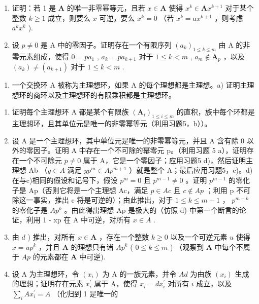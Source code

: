 \begin{enumerate}
\def\labelenumi{\alph{enumi})}
\setcounter{enumi}{2}
\item
  证明：若 1 是 \(\mathbf{A}\) 的唯一非零幂等元，且若 \(x \in \mathbf{A}\) 使得 \(x^k \in \mathbf{A}x^{k+1}\) 对于某个整数 \(k \geqslant 1\) 成立，则要么 \(x\) 可逆，要么 \(x^k = 0\) （若 \(x^k = ax^{k+1}\) ，则考虑 \(a^k x^k\) ).
\item
  设 \(p \neq 0\) 是 A 中的零因子。证明存在一个有限序列 \((a_k)_{1 \leqslant k \leqslant m}\) 由 A 的非零元素组成，使得 \(0 = pa_1\) , \(a_k = pa_{k+1}\) 对于 \(1 \leqslant k < m\) , \(a_m \notin \mathbf{A}_p\) ，以及 \((a_k) \neq (a_{k+1})\) 对于 \(1 \leqslant k < m\) .
\end{enumerate}

\begin{enumerate}
\def\labelenumi{\arabic{enumi})}
\setcounter{enumi}{5}
\tightlist
\item
  一个交换环 A 被称为主理想环，如果 A 的每个理想都是主理想。a) 证明主理想环的商环以及主理想环的有限乘积都是主理想环。
\end{enumerate}

\begin{enumerate}
\def\labelenumi{\alph{enumi})}
\setcounter{enumi}{1}
\item
  证明每个主理想环 A 都是某个有限族 \((\mathbf{A}_{i})_{1\leq i\leq m}\) 的直积，族中每个环都是主理想环，且其单位元是唯一的非零幂等元（利用习题5，b））。
\item
  设 A 是一个主理想环，其中单位元是唯一的非零幂等元，并且 A 含有除 0 以外的零因子。证明 A 中存在一个不可除的幂零元 p。（利用习题 5 a），证明存在一个不可除元 \(p \neq 0\) 属于 A，它是一个零因子；应用习题5 d)，然后证明主理想 Ab （\(y \in A\) 满足 \(yp^{m} \in Ap^{m+1}\) ）就是整个 A；最后应用习题5，c)。d) 在与c)相同的假设和记号下，假设 \(p^{m} = 0\) 且 \(p^{m-1} \neq 0\) 。证明 \(p^{m-1}\) 的零化子是 Ap（否则它将是一个主理想 Ac，满足 \(p \in Ac\) 且 \(c \notin Ap\) ；利用 p 不可除这一事实，推出 c 将是可逆的）；由此推出，对于 \(1 \leq k \leq m-1\) ， \(p^{m-k}\) 的零化子是 \(Ap^{k}\) 。由此得出理想 Ap 是极大的（仿照 d) 中第一个断言的论证，利用 1 - xp 在 A 中可逆，对所有 \(x \in A\) .
\item
  由 \(d\) ) 推出，对所有 \(x \in \mathbf{A}\) ，存在一个整数 \(k \geqslant 0\) 以及一个可逆元素 \(u\) 使得 \(x = up^k\) ，并且 \(\mathbf{A}\) 的理想只有诸 \(Ap^k\) ( \(0 \leqslant k \leqslant m\) ) （观察到 \(\mathbf{A}\) 中每个不属于 \(Ap\) 的元素都在 \(\mathbf{A}\) 中可逆).
\item
  设 A 为主理想环，令 \((x_{i})\) 为 A 的一族元素，并令 \(Ad\) 为由族 \((x_{i})\) 生成的理想；证明存在元素 \(x_{i}^{\prime}\) 属于 A，使得 \(x_{i} = dx_{i}^{\prime}\) 对所有 \(i\) 成立，以及 \(\sum_{i} Ax_{i}^{\prime} = A\) （化归到 1 是唯一的
\end{enumerate}

